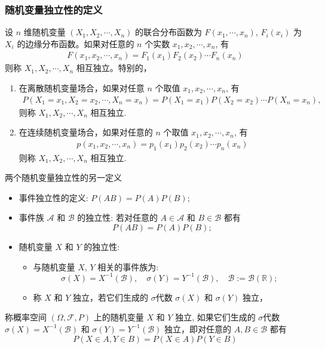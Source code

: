 \documentclass[Prob-All.tex]{subfiles}
\begin{document}
\begin{frame}
	\frametitle{随机变量独立性的定义}
	\begin{defi}
	 设 $n$ 维随机变量 $(X_1,X_2,\cdots,X_n)$ 的联合分布函数为 $F (x_1,
		\cdots,x_n)$, $F_i (x_i)$ 为 $X_i$ 的边缘分布函数。如果对任意的 $n$ 个实数 $x_1,x_2,\cdots, x_n$, 有
		\begin{eqnarray*}
			F(x_1,x_2,\cdots, x_n)=F_1(x_1)F_2(x_2)\cdots F_n(x_n)
		\end{eqnarray*}
		则称 $X_1,X_2,\cdots, X_n$ 相互独立。特别的，
	\end{defi}
	\pause
	\begin{enumerate}[<+-|alert@+>]
		\item 在离散随机变量场合，如果对任意 $n$ 个取值 $x_1,x_2,\cdots, x_n$, 有
		{\small     \begin{eqnarray*}
				P(X_1=x_1,X_2=x_2,\cdots,X_n=x_n)=P(X_1=x_1)P(X_2=x_2)\cdots P(X_n=x_n),
		\end{eqnarray*}}
		则称 $X_1,X_2,\cdots, X_n$ 相互独立.


		\item 在连续随机变量场合，如果对任意的 $n$ 个取值 $x_1,x_2,\cdots, x_n$, 有
		\begin{eqnarray*}
			p(x_1,x_2,\cdots, x_n)=p_1(x_1)p_2(x_2)\cdots p_n(x_n)
		\end{eqnarray*}
		则称 $X_1,X_2,\cdots, X_n$ 相互独立.
	\end{enumerate}
\end{frame}

\begin{frame}{两个随机变量独立性的另一定义}
\begin{itemize}[<+-|alert@+>]
\item 事件独立性的定义: $P(AB)=P(A)P(B)$;
\item 事件族 $\mathcal{A}$ 和 $\mathcal{B}$ 的独立性: 若对任意的 $A\in \mathcal{A}$ 和 $B\in \mathcal{B}$ 都有 $$P(AB)=P(A)P(B);$$
\item 随机变量 $X$ 和 $Y$ 的独立性:
\begin{itemize}[<+-|alert@+>]
\item 与随机变量 $X$, $Y$ 相关的事件族为:
$$\sigma(X)=X^{-1}(\mathcal{B}), \quad \sigma(Y)=Y^{-1}(\mathcal{B}), \quad \mathcal{B}:=\mathcal{B}(\mathbb{R});$$
\item 称 $X$ 和 $Y$ 独立，若它们生成的 $\sigma$代数 $\sigma(X)$ 和 $\sigma(Y)$ 独立，
\end{itemize}

\end{itemize}

\pause
\begin{defi}
称概率空间 $(\Omega, \mathcal{F}, P)$ 上的随机变量 $X$ 和 $Y$ 独立, 如果它们生成的 $\sigma$代数 $\sigma(X)=X^{-1}(\mathcal{B})$ 和 $\sigma(Y)=Y^{-1}(\mathcal{B})$ 独立，即对任意的 $A, B \in \mathcal{B}$ 都有
\[
P(X \in A, Y \in B)=P(X \in A) P(Y \in B)
\]
\end{defi}

\end{frame}
\end{document}
